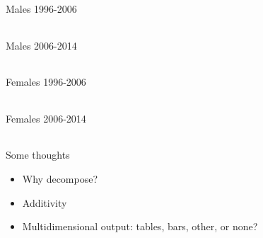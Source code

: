 \documentclass[20pt,usenames,dvipsnames]{beamer}
\begin{document}
\begin{frame}[plain]
\Large
\begin{center}
Males 1996-2006
\vspace{1em}

 \begin{tabular}{rrr|r}
      
     \end{tabular}
     \end{center}
\end{frame}
\begin{frame}[plain]
\Large
\begin{center}
Males 2006-2014
\vspace{1em}

      \begin{tabular}{rrr|r}
      
     \end{tabular}
     \end{center}
\end{frame}
  
  
\begin{frame}[plain]
\Large
\begin{center}
Females 1996-2006
\vspace{1em}

 \begin{tabular}{rrr|r}
      
     \end{tabular}
      \end{center}
\end{frame}
\begin{frame}[plain]
\Large
\begin{center}
Females 2006-2014

\vspace{1em}
      \begin{tabular}{rrr|r}
      
     \end{tabular}
     \end{center}
\end{frame}     
 
\begin{frame}[plain]
\Large
\begin{center}
Some thoughts
\begin{itemize}[<+->]
\item Why decompose?
\item Additivity
\item Multidimensional output: tables, bars, other, or none?
\end{itemize}
\end{center}
\end{frame}
\end{document}
